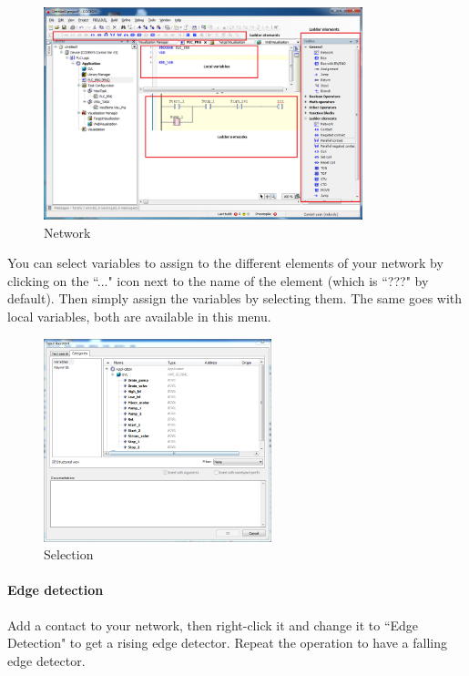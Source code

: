 \documentclass[10pt,a4paper]{article}
\begin{document}
\begin{figure}[h!]
	\begin{center}
		\includegraphics[width=350px]{img7.PNG}
	\end{center}
\caption{Network}
\label{fig:network}
\end{figure}

You can select variables to assign to the different elements of your network by clicking on the ``..." icon next to the name of the element (which is ``???" by default).
Then simply assign the variables by selecting them.
The same goes with local variables, both are available in this menu.

\begin{figure}[h!]
	\begin{center}
		\includegraphics[width=250px]{img8.PNG}
	\end{center}
\caption{Selection}
\label{fig:sel}
\end{figure}

\paragraph{Edge detection}
Add a contact to your network, then right-click it and change it to ``Edge Detection" to get a rising edge detector.
Repeat the operation to have a falling edge detector.
\end{document}
